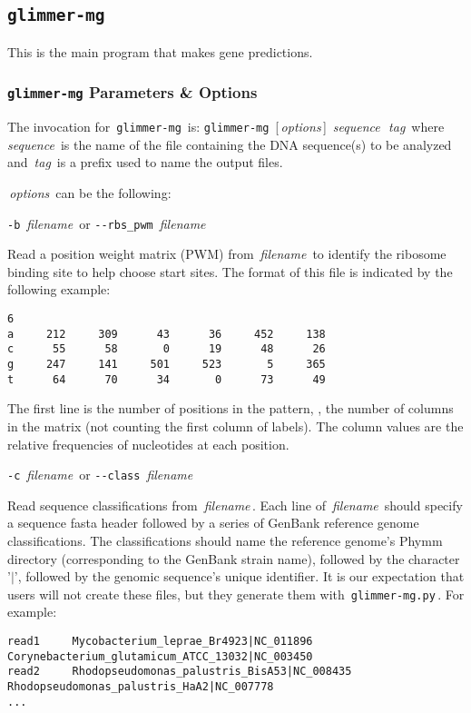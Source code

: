 \documentclass[fleqn,titlepage,11pt]{article}
\def\Desc#1{\,\mbox{\emph{#1}}\,}
\def\Pg#1{\texttt{#1}}
\begin{document}
\subsection{\Pg{glimmer-mg}}

This is the main program that makes gene predictions.

\subsubsection{\Pg{glimmer-mg} Parameters \& Options}
The invocation for \,\Pg{glimmer-mg}\, is:
\bq
  \Pg{glimmer-mg}\, [\Desc{options}] \Desc{sequence} \Desc{tag}
\eq
where \Desc{sequence} is the name of the file containing the DNA
sequence(s) to be analyzed and \Desc{tag} is a prefix used to name the
output files.

\Desc{options} can be the following:
\bl{}\RaggedRight

\exdent
  \verb`-b` \Desc{filename} \enskip or \enskip \verb`--rbs_pwm` \Desc{filename}

  Read a position weight matrix (PWM) from \Desc{filename} to identify
  the ribosome binding site to help choose start sites.  The format of
  this file is indicated by the following example:
\BSV
\begin{verbatim}
6
a     212     309      43      36     452     138
c      55      58       0      19      48      26
g     247     141     501     523       5     365
t      64      70      34       0      73      49
\end{verbatim}
\ESV
  The first line is the number of positions in the pattern, \ie,
  the number of columns in the matrix (not counting
  the first column of labels).  The column values are the relative
  frequencies of nucleotides at each position.

\exdent
  \verb`-c` \Desc{filename} \enskip or \enskip \verb`--class` \Desc{filename}

  Read sequence classifications from \Desc{filename}. Each line of
  \Desc{filename} should specify a sequence fasta header followed by a
  series of GenBank reference genome classifications. The
  classifications should name the reference genome's Phymm directory
  (corresponding to the GenBank strain name), followed by the
  character '$|$', followed by the genomic sequence's unique
  identifier. It is our expectation that users will not create these
  files, but they generate them with \,\Pg{glimmer-mg.py}\,. For
  example:

\BSV
\footnotesize{
\begin{verbatim}
read1     Mycobacterium_leprae_Br4923|NC_011896 Corynebacterium_glutamicum_ATCC_13032|NC_003450
read2     Rhodopseudomonas_palustris_BisA53|NC_008435 Rhodopseudomonas_palustris_HaA2|NC_007778
...
\end{verbatim}
}
\ESV
\end{document}
